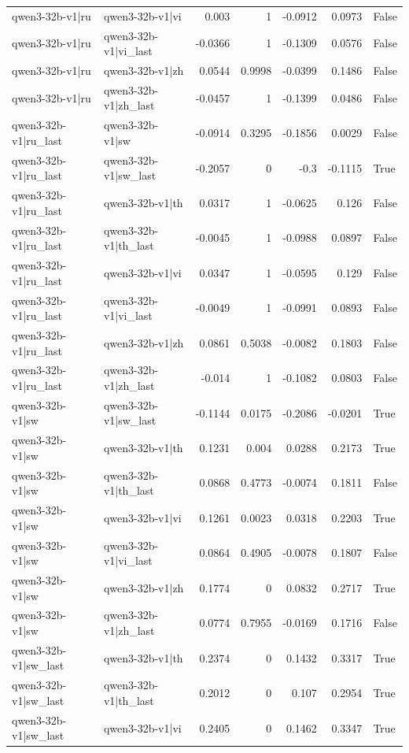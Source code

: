 \begin{table}
\begin{tabular}{l l r r r r l}
qwen3-32b-v1|ru & qwen3-32b-v1|vi & 0.003 & 1 & -0.0912 & 0.0973 & False \\
qwen3-32b-v1|ru & qwen3-32b-v1|vi_last & -0.0366 & 1 & -0.1309 & 0.0576 & False \\
qwen3-32b-v1|ru & qwen3-32b-v1|zh & 0.0544 & 0.9998 & -0.0399 & 0.1486 & False \\
qwen3-32b-v1|ru & qwen3-32b-v1|zh_last & -0.0457 & 1 & -0.1399 & 0.0486 & False \\
qwen3-32b-v1|ru_last & qwen3-32b-v1|sw & -0.0914 & 0.3295 & -0.1856 & 0.0029 & False \\
qwen3-32b-v1|ru_last & qwen3-32b-v1|sw_last & -0.2057 & 0 & -0.3 & -0.1115 & True \\
qwen3-32b-v1|ru_last & qwen3-32b-v1|th & 0.0317 & 1 & -0.0625 & 0.126 & False \\
qwen3-32b-v1|ru_last & qwen3-32b-v1|th_last & -0.0045 & 1 & -0.0988 & 0.0897 & False \\
qwen3-32b-v1|ru_last & qwen3-32b-v1|vi & 0.0347 & 1 & -0.0595 & 0.129 & False \\
qwen3-32b-v1|ru_last & qwen3-32b-v1|vi_last & -0.0049 & 1 & -0.0991 & 0.0893 & False \\
qwen3-32b-v1|ru_last & qwen3-32b-v1|zh & 0.0861 & 0.5038 & -0.0082 & 0.1803 & False \\
qwen3-32b-v1|ru_last & qwen3-32b-v1|zh_last & -0.014 & 1 & -0.1082 & 0.0803 & False \\
qwen3-32b-v1|sw & qwen3-32b-v1|sw_last & -0.1144 & 0.0175 & -0.2086 & -0.0201 & True \\
qwen3-32b-v1|sw & qwen3-32b-v1|th & 0.1231 & 0.004 & 0.0288 & 0.2173 & True \\
qwen3-32b-v1|sw & qwen3-32b-v1|th_last & 0.0868 & 0.4773 & -0.0074 & 0.1811 & False \\
qwen3-32b-v1|sw & qwen3-32b-v1|vi & 0.1261 & 0.0023 & 0.0318 & 0.2203 & True \\
qwen3-32b-v1|sw & qwen3-32b-v1|vi_last & 0.0864 & 0.4905 & -0.0078 & 0.1807 & False \\
qwen3-32b-v1|sw & qwen3-32b-v1|zh & 0.1774 & 0 & 0.0832 & 0.2717 & True \\
qwen3-32b-v1|sw & qwen3-32b-v1|zh_last & 0.0774 & 0.7955 & -0.0169 & 0.1716 & False \\
qwen3-32b-v1|sw_last & qwen3-32b-v1|th & 0.2374 & 0 & 0.1432 & 0.3317 & True \\
qwen3-32b-v1|sw_last & qwen3-32b-v1|th_last & 0.2012 & 0 & 0.107 & 0.2954 & True \\
qwen3-32b-v1|sw_last & qwen3-32b-v1|vi & 0.2405 & 0 & 0.1462 & 0.3347 & True \\

\end{tabular}
\end{table}
